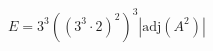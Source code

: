 \documentclass[preview]{standalone}
\begin{document}
\begin{align*}
E = 3^3 ((3^3 \cdot 2)^2)^3 |\text{adj}(A^2)|
\end{align*}
\end{document}
